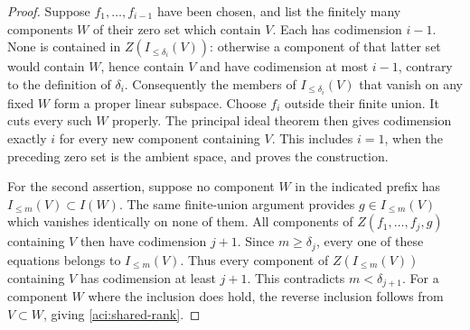 \begin{proof}
Suppose $f_1,\ldots,f_{i-1}$ have been chosen, and list the finitely
many components $W$ of their zero set which contain $V$.  Each has
codimension $i-1$.  None is contained in $Z(I_{\le\delta_i}(V))$:
otherwise a component of that latter set would contain $W$, hence
contain $V$ and have codimension at most $i-1$, contrary to the
definition of $\delta_i$.  Consequently the members of
$I_{\le\delta_i}(V)$ that vanish on any fixed $W$ form a proper
linear subspace.  Choose $f_i$ outside their finite union.  It cuts
every such $W$ properly.  The principal ideal theorem then gives
codimension exactly $i$ for every new component containing $V$.
This includes $i=1$, when the preceding zero set is the ambient space,
and proves the construction.

For the second assertion, suppose no component $W$ in the indicated
prefix has $I_{\le m}(V)\subset I(W)$.  The same finite-union argument
provides $g\in I_{\le m}(V)$ which vanishes identically on none of
them.  All components of $Z(f_1,\ldots,f_j,g)$ containing $V$ then
have codimension $j+1$.  Since $m\ge\delta_j$, every one of these
equations belongs to $I_{\le m}(V)$.  Thus every component of
$Z(I_{\le m}(V))$ containing $V$ has codimension at least $j+1$.
This contradicts $m<\delta_{j+1}$.  For a component $W$ where the
inclusion does hold, the reverse inclusion follows from $V\subset W$,
giving \eqref{aci:shared-rank}.
\end{proof}

